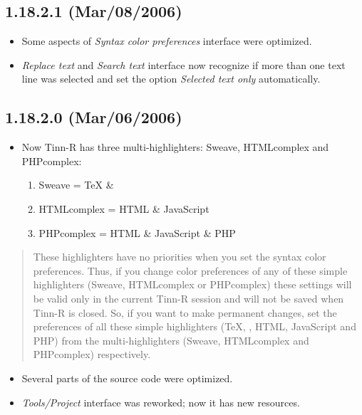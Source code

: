 \subsection{1.18.2.1 (Mar/08/2006)}

\begin{itemize}
  \item Some aspects of \textit{Syntax color preferences} interface
    were optimized.
  \item \textit{Replace text} and \textit{Search text} interface now
    recognize if more than one text line was selected and set the
    option \textit{Selected text only} automatically.
\end{itemize}


\subsection{1.18.2.0 (Mar/06/2006)}

\begin{itemize}
  \item Now Tinn-R has three multi-highlighters: Sweave, HTMLcomplex
    and PHPcomplex:
    \begin{enumerate}
      \item Sweave      = TeX  \& \RR{}
      \item HTMLcomplex = HTML \& JavaScript
      \item PHPcomplex  = HTML \& JavaScript \& PHP
    \end{enumerate}
\end{itemize}

\begin{footnotesize}
  \begin{quotation}
    These highlighters have no priorities when you set the
    syntax color preferences. Thus, if you change color preferences of
    any of these simple highlighters (Sweave, HTMLcomplex or PHPcomplex) these
    settings will be valid only in the current Tinn-R session and will not be
    saved when Tinn-R is closed. So, if you want to make permanent changes, set
    the preferences of all these simple highlighters (TeX, \RR, HTML, JavaScript
    and PHP) from the multi-highlighters (Sweave, HTMLcomplex and PHPcomplex)
    respectively.
  \end{quotation}
\end{footnotesize}

\begin{itemize}
  \item Several parts of the source code were optimized.
  \item \textit{Tools/Project} interface was reworked; now it has new resources.
\end{itemize}


